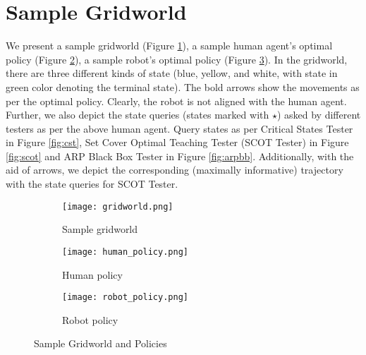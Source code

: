 \newpage
\section{Sample Gridworld}

We present a sample gridworld (Figure \ref{fig:gridworld}), a sample human agent's optimal policy (Figure \ref{fig:human_policy}), a sample robot's optimal policy (Figure \ref{fig:robot_policy}). In the gridworld, there are three different kinds of state (blue, yellow, and white, with state in green color denoting the terminal state). The bold arrows show the movements as per the optimal policy. Clearly, the robot is not aligned with the human agent. Further, we also depict the state queries (states marked with $\star$) asked by different testers as per the above human agent. Query states as per Critical States Tester in Figure \ref{fig:cst}, Set Cover Optimal Teaching Tester (SCOT Tester) in Figure \ref{fig:scot} and ARP Black Box Tester in Figure \ref{fig:arpbb}. Additionally, with the aid of arrows, we depict the corresponding (maximally informative) trajectory with the state queries for SCOT Tester.

\begin{figure}[hbtp]
     \centering
     \begin{subfigure}[hbtp]{0.3\textwidth}
         \centering
         \texttt{[image: gridworld.png]}
         \caption{Sample gridworld}
         \label{fig:gridworld}
     \end{subfigure}
    \hspace{5mm}
     \begin{subfigure}[hbtp]{0.3\textwidth}
         \centering
         \texttt{[image: human\_policy.png]}
         \caption{Human policy}
         \label{fig:human_policy}
     \end{subfigure}
    \hspace{5mm}
     \begin{subfigure}[hbtp]{0.3\textwidth}
         \centering
         \texttt{[image: robot\_policy.png]}
         \caption{Robot policy}
         \label{fig:robot_policy}
     \end{subfigure}
        \caption{Sample Gridworld and Policies}
        \label{fig:policies}
\end{figure}

